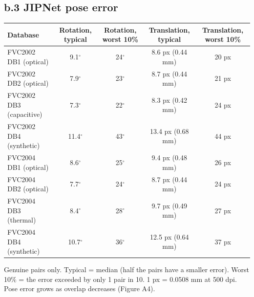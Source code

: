 \documentclass[10pt,a4paper]{article}
\begin{document}
\subsection*{b.3 \textperiodcentered{} JIPNet pose error}
\begin{tabularx}{\textwidth}{@{}>{\raggedright}X ccc c@{}}\toprule
\textbf{Database} & \textbf{Rotation, typical} & \textbf{Rotation, worst 10\%} & \textbf{Translation, typical} & \textbf{Translation, worst 10\%}\\\midrule
FVC2002 DB1 (optical) & 9.1$^\circ$ & 24$^\circ$ & 8.6 px (0.44 mm) & 20 px\\
FVC2002 DB2 (optical) & 7.9$^\circ$ & 23$^\circ$ & 8.7 px (0.44 mm) & 21 px\\
FVC2002 DB3 (capacitive) & 7.3$^\circ$ & 22$^\circ$ & 8.3 px (0.42 mm) & 24 px\\
FVC2002 DB4 (synthetic) & 11.4$^\circ$ & 43$^\circ$ & 13.4 px (0.68 mm) & 44 px\\
FVC2004 DB1 (optical) & 8.6$^\circ$ & 25$^\circ$ & 9.4 px (0.48 mm) & 26 px\\
FVC2004 DB2 (optical) & 7.7$^\circ$ & 24$^\circ$ & 8.7 px (0.44 mm) & 24 px\\
FVC2004 DB3 (thermal) & 8.4$^\circ$ & 28$^\circ$ & 9.7 px (0.49 mm) & 27 px\\
FVC2004 DB4 (synthetic) & 10.7$^\circ$ & 36$^\circ$ & 12.5 px (0.64 mm) & 37 px\\
\bottomrule\end{tabularx}
{\footnotesize Genuine pairs only. Typical = median (half the pairs have a smaller error). Worst 10\% = the error exceeded by only 1 pair in 10. 1 px = 0.0508 mm at 500 dpi. Pose error grows as overlap decreases (Figure A4).\par}
\end{document}
